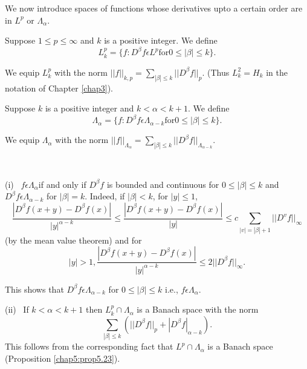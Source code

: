 We now introduce spaces of functions whose derivatives upto a certain
order are in $L^p$ or $\Lambda_{\alpha}$. 

\setcounter{defi}{26}
\begin{defi}\label{chap5:def5.27}%
  Suppose $1 \leq p \leq \infty$ and $k$ is a positive integer.  We define
  $$
  L^p_k = \{ f : D^{\beta} f \epsilon L^p \text{for} 0 \leq |\beta| \leq k\}.
  $$
\end{defi}

We equip $L^p_k$ with the norm $|| f || _{k,p}= \sum\limits_{|\beta|
  \leq k} || D^{\beta}f ||_p$. (Thus $L^2_k = H_k$ in the notation of
Chapter \ref{chap3}). 


\begin{defi}\label{chap5:def5.28}%
  Suppose $k$ is a positive integer and $k < \alpha < k + 1$. We define
  $$
  \Lambda_{\alpha} = \{ f : D ^{\beta} f \epsilon \Lambda_{\alpha -
    k} \text{for} 0 \leq |\beta| \leq k\}. 
  $$
\end{defi}

We equip $\Lambda_{\alpha}$ with the norm $|| f || _{\Lambda_{\alpha}}
= \sum_{|\beta| \leq k} || D^{\beta} f ||_{\Lambda_{\alpha - k}}$. 

\setcounter{remarks}{28}
\begin{remarks}\label{chap5:rem5.29}%
~

  \noindent (i)~ $f \epsilon \Lambda_{\alpha}$\pageoriginale if and only if
    $D^{\beta} f$ is 
    bounded and continuous for $ 0 \leq |\beta| \leq k$ and $D^{\beta }
    f \epsilon \Lambda_{\alpha -k}$ for $|\beta| =k$. Indeed, if
    $|\beta| < k$, for $|y | \leq 1$, 
    $$
    \frac{|D^{\beta} f (x+y) - D^{\beta} f (x)|}{ |y|^{\alpha -k}} \leq
    \frac{|D^{\beta} f (x+y) - D^{\beta} f (x)|}{|y|} \leq c\sum_{|v| =
      |\beta| +1} || D^v f ||_{\infty} 
    $$
    (by the mean value theorem) and for 
    $$
    |y| > 1, \dfrac{|D^{\beta} f
      (x+y) - D^{\beta} f (x)|}{ |y|^{\alpha -k}} \leq 2 || D^{\beta } f
    ||_{\infty}.
    $$ 
  
    This shows that $D^\beta f \epsilon \Lambda_{\alpha -k} $ for
    $0\leq |\beta| \leq k $ i.e., $f \epsilon \Lambda_{\alpha}$. 
    
    \noindent (ii)~ If $k < \alpha < k+1$ then $L^p_k \cap \Lambda_{\alpha}$ is a
    Banach space with the norm 
    $$
    \sum_{|\beta| \leq k} (|| D^{\beta} f ||_p + | D^\beta f |_{\alpha -k}).
    $$
    This follows from the corresponding fact that $L^p \cap
    \Lambda_{\alpha}$ is a Banach space (Proposition \ref{chap5:prop5.23}).  
\end{remarks}

